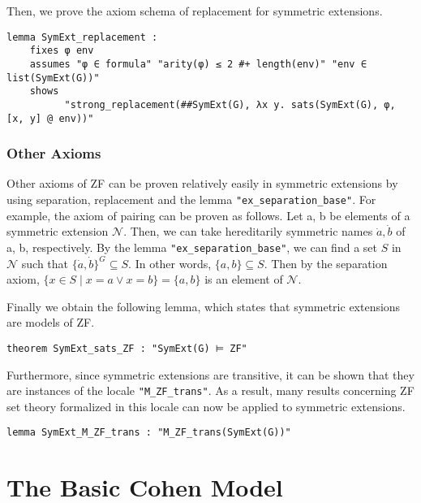 \documentclass{report}
\newenvironment{isaframe}{\begin{mdframed}[topline=false, rightline=false, bottomline=false]}{\end{mdframed}}
\begin{document}
Then, we prove the axiom schema of replacement for symmetric extensions.
\begin{isaframe}
\begin{verbatim}
lemma SymExt_replacement :
    fixes φ env
    assumes "φ ∈ formula" "arity(φ) ≤ 2 #+ length(env)" "env ∈ list(SymExt(G))" 
    shows 
          "strong_replacement(##SymExt(G), λx y. sats(SymExt(G), φ, [x, y] @ env))" 
\end{verbatim}
\end{isaframe}


\subsubsection{Other Axioms}
Other axioms of ZF can be proven relatively easily in symmetric extensions by using separation, replacement and the lemma \texttt{"ex\_separation\_base"}.
For example, the axiom of pairing can be proven as follows. 
Let a, b be elements of a symmetric extension $\mathcal{N}$.
Then, we can take hereditarily symmetric names $\dot{a}, \dot{b}$ of a, b, respectively.
By the lemma \texttt{"ex\_separation\_base"}, we can find a set $S$ in $\mathcal{N}$ such that $\{ \dot{a}, \dot{b} \}^G \subseteq S$.
In other words, $\{ a, b \} \subseteq S$. 
Then by the separation axiom, $\{ x \in S \mid x = a \lor x = b \} = \{ a, b \}$ is an element of $\mathcal{N}$.

Finally we obtain the following lemma, which states that symmetric extensions are models of ZF.
\begin{isaframe}
\begin{verbatim}
theorem SymExt_sats_ZF : "SymExt(G) ⊨ ZF" 
\end{verbatim}
\end{isaframe}

Furthermore, since symmetric extensions are transitive, it can be shown that they are 
instances of the locale \texttt{"M\_ZF\_trans"}.
As a result, many results concerning ZF set theory formalized in this locale can now be applied to symmetric extensions.

\begin{isaframe}
\begin{verbatim}
lemma SymExt_M_ZF_trans : "M_ZF_trans(SymExt(G))"
\end{verbatim}
\end{isaframe}



\section{The Basic Cohen Model}
\end{document}
